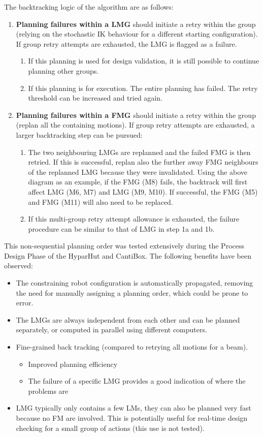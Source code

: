 The backtracking logic of the algorithm are as follows:
\begin{enumerate}
    \item \textbf{Planning failures within a LMG} should initiate a retry within the group (relying on the stochastic IK behaviour for a different starting configuration). If group retry attempts are exhausted, the LMG is flagged as a failure.
    \begin{enumerate}[nosep]
        \item If this planning is used for design validation, it is still possible to continue planning other groups.
        \item If this planning is for execution. The entire planning has failed. The retry threshold can be increased and tried again.
    \end{enumerate}
    \item \textbf{Planning failures within a FMG} should initiate a retry within the group (replan all the containing motions). If group retry attempts are exhausted, a larger backtracking step can be pursued:
    \begin{enumerate}[nosep]
        \item The two neighbouring LMGs are replanned and the failed FMG is then retried. If this is successful, replan also the further away FMG neighbours of the replanned LMG because they were invalidated. Using the above diagram as an example, if the FMG (M8) fails, the backtrack will first affect LMG (M6, M7) and LMG (M9, M10). If successful, the FMG (M5) and FMG (M11) will also need to be replaced.
        \item If this multi-group retry attempt allowance is exhausted, the failure procedure can be similar to that of LMG in step 1a and 1b.
    \end{enumerate}
\end{enumerate}

This non-sequential planning order was tested extensively during the Process Design Phase of the HyparHut and CantiBox. The following benefits have been observed:
\begin{itemize}
    \item The constraining robot configuration is automatically propagated, removing the need for manually assigning a planning order, which could be prone to error.
    \item The LMGs are always independent from each other and can be planned separately, or computed in parallel using different computers.
    \item Fine-grained back tracking (compared to retrying all motions for a beam).
    \begin{itemize}[nosep]
        \item Improved planning efficiency
        \item The failure of a specific LMG provides a good indication of where the problems are
    \end{itemize}
    \item LMG typically only contains a few LMs, they can also be planned very fast because no FM are involved. This is potentially useful for real-time design checking for a small group of actions (this use is not tested).
\end{itemize}

